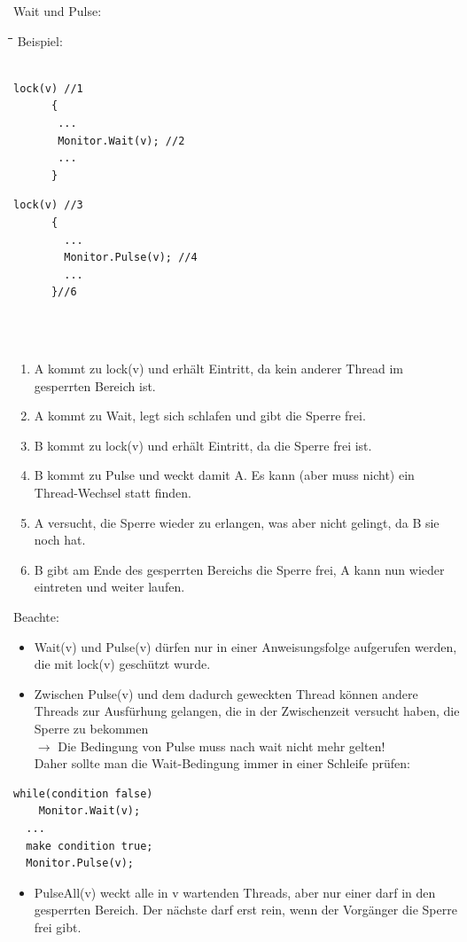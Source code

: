 Wait und Pulse:
\begin{tabbing}
  \hspace*{1cm}\=\hspace*{4.2cm}\=\hspace*{3cm}\=\hspace*{2.7cm}\= \kill
  Beispiel:\\
   \> \> \\
  \>\begin{lstlisting}[style=C]
      lock(v) //1
      {
       ...
       Monitor.Wait(v); //2
       ...
      }
    \end{lstlisting} \> \> \>
    \begin{lstlisting}[style=C]
      lock(v) //3
      {
        ...
        Monitor.Pulse(v); //4
        ...
      }//6
    \end{lstlisting} \\\\
\end{tabbing}
\begin{enumerate}
   \item A kommt zu lock(v) und erhält Eintritt, da kein anderer Thread im
   gesperrten Bereich ist. 
   \item A kommt zu Wait, legt sich schlafen und gibt die Sperre frei. 
   \item B kommt zu lock(v) und erhält Eintritt, da die Sperre frei ist. 
   \item B kommt zu Pulse und weckt damit A. Es kann (aber muss nicht) ein
   Thread-Wechsel statt finden. 
   \item A versucht, die Sperre wieder zu erlangen, was aber nicht gelingt, da B
   sie noch hat. 
   \item B gibt am Ende des gesperrten Bereichs die Sperre frei, A kann nun
   wieder eintreten und weiter laufen. 
\end{enumerate}
Beachte: 
\begin{itemize}
   \item Wait(v) und Pulse(v) dürfen nur in einer Anweisungsfolge aufgerufen
   werden, die mit lock(v) geschützt wurde.
   \item Zwischen Pulse(v) und dem dadurch geweckten Thread können andere
   Threads zur Ausfürhung gelangen, die in der Zwischenzeit versucht haben, die
   Sperre zu bekommen\\ $\rightarrow$ Die Bedingung von Pulse muss nach wait
   nicht mehr gelten!\\
   Daher sollte man die Wait-Bedingung immer in einer Schleife prüfen: 
\end{itemize}
\begin{lstlisting}[style=C]
  while(condition false)
    Monitor.Wait(v); 
  ...
  make condition true;
  Monitor.Pulse(v);       
\end{lstlisting}
\begin{itemize}
  \item PulseAll(v) weckt alle in v wartenden Threads, aber nur einer darf in
  den gesperrten Bereich. Der nächste darf erst rein, wenn der Vorgänger die
  Sperre frei gibt.
\end{itemize}

